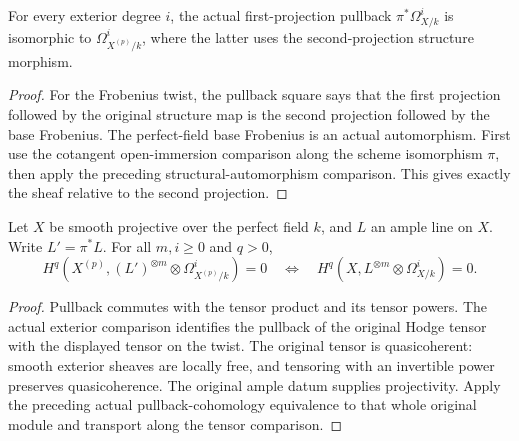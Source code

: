 \begin{lemma}
\label{lem:kn-frobenius-twist-differentials}
\leanok
{}
For every exterior degree $i$, the actual first-projection pullback
$\pi^*\Omega^i_{X/k}$ is isomorphic to $\Omega^i_{X^{(p)}/k}$, where
the latter uses the second-projection structure morphism.
\end{lemma}
\begin{proof}
For the Frobenius twist, the pullback square says that the first
projection followed by the original structure map is the second
projection followed by the base Frobenius.  The perfect-field base
Frobenius is an actual automorphism.  First use the cotangent
open-immersion comparison along the scheme isomorphism $\pi$, then
apply the preceding structural-automorphism comparison.  This gives
exactly the sheaf relative to the second projection.
\end{proof}

\begin{theorem}
\label{thm:kn-frobenius-twist-hodge-cohomology}
\leanok
{}
Let $X$ be smooth projective over the perfect field $k$, and $L$ an
ample line on $X$.  Write $L'=\pi^*L$.  For all $m,i\geq0$ and $q>0$,
\[
 H^q(X^{(p)},(L')^{\otimes m}\otimes\Omega^i_{X^{(p)}/k})=0
 \quad\Longleftrightarrow\quad
 H^q(X,L^{\otimes m}\otimes\Omega^i_{X/k})=0.
\]
\end{theorem}
\begin{proof}
Pullback commutes with the tensor product and its tensor powers.
The actual exterior comparison identifies the pullback of the original
Hodge tensor with the displayed tensor on the twist.  The original
tensor is quasicoherent: smooth exterior sheaves are locally free,
and tensoring with an invertible power preserves quasicoherence.
The original ample datum supplies projectivity.  Apply the preceding
actual pullback-cohomology equivalence to that whole original module
and transport along the tensor comparison.
\end{proof}
